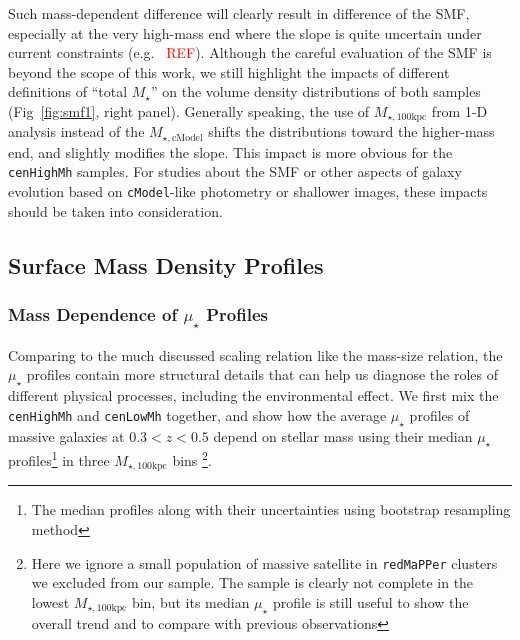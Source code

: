 \documentclass{emulateapj}
\def\redm{\texttt{redMaPPer}}
\def\cmodel{\texttt{cModel}}
\def\rbcg{\texttt{cenHighMh}}
\def\nbcg{\texttt{cenLowMh}}
\def\mstar{{$M_{\star}$}}
\def\mtot{{$M_{\star,100\mathrm{kpc}}$}}
\def\mcmodel{{$M_{\star,\mathrm{cModel}}$}}
\def\mden{{$\mu_{\star}$}}
\newcommand{\addref}{{\textcolor{red}{REF}}}
\begin{document}
\begin{CJK*}{UTF8}{gbsn}
    Such mass-dependent difference will clearly result in difference of the SMF, 
    especially at the very high-mass end where the slope is quite uncertain under
    current constraints (e.g. \ \addref{}).
    Although the careful evaluation of the SMF is beyond the scope of this work, 
    we still highlight the impacts of different definitions of ``total \mstar{}''
    on the volume density distributions of both samples (Fig~\ref{fig:smf1}, 
    right panel).  
    Generally speaking, the use of \mtot{} from 1-D analysis instead of the
    \mcmodel{} shifts the distributions toward the higher-mass end, and slightly 
    modifies the slope.
    This impact is more obvious for the \rbcg{} samples.
    For studies about the SMF or other aspects of galaxy evolution based on 
    \cmodel{}-like photometry or shallower images, these impacts should be 
    taken into consideration.


\subsection{Surface Mass Density Profiles}
    \label{ssec:sbp_compare}

\subsubsection{Mass Dependence of \mden{} Profiles}
    \label{sssec:sbp_inter}
          
    Comparing to the much discussed scaling relation like the mass-size relation, 
    the \mden{} profiles contain more structural details that can help us diagnose the 
    roles of different physical processes, including the environmental effect.  
    We first mix the \rbcg{} and \nbcg{} together, and show how the average \mden{}
    profiles of massive galaxies at $0.3 < z < 0.5$ depend on stellar mass using their 
    median \mden{} profiles\footnote{The median profiles along with their uncertainties 
    using bootstrap resampling method} in three \mtot{} bins \footnote{Here we ignore a 
    small population of massive satellite in \redm{} clusters we excluded from our 
    sample.
    The sample is clearly not complete in the lowest \mtot{} bin, but its median \mden{}
    profile is still useful to show the overall trend and to compare with previous 
    observations}.


\end{CJK*}
\end{document}
